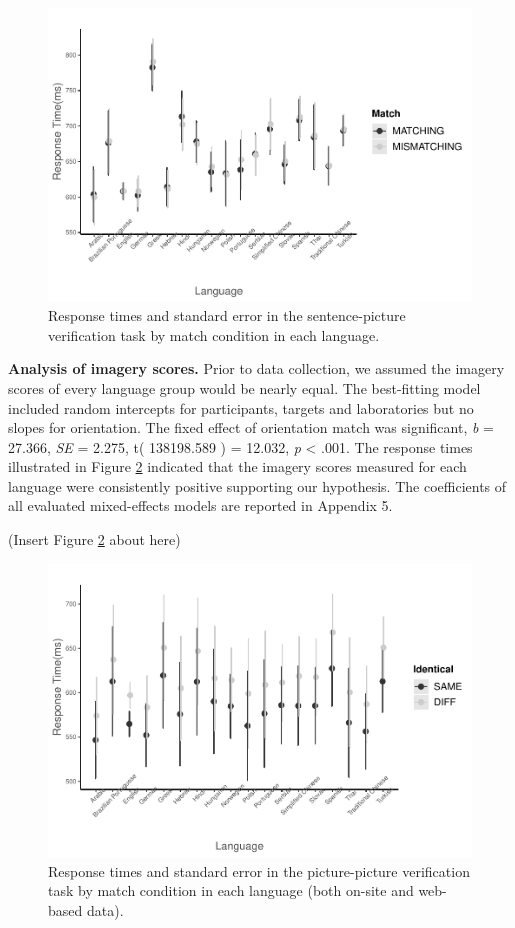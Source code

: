 \documentclass[
  man,floatsintext]{apa6}
\begin{document}
\begin{figure}
\centering
\includegraphics{Stage2_Report_0504_files/figure-latex/plot-SP-site-lme-1.pdf}
\caption{\label{fig:plot-SP-site-lme}Response times and standard error in the sentence-picture verification task by match condition in each language.}
\end{figure}

\textbf{Analysis of imagery scores.} Prior to data collection, we assumed the imagery scores of every language group would be nearly equal. The best-fitting model included random intercepts for participants, targets and laboratories but no slopes for orientation. The fixed effect of orientation match was significant, \emph{b} = 27.366, \emph{SE} = 2.275, t( 138198.589 ) = 12.032, \emph{p} \textless{} .001. The response times illustrated in Figure \ref{fig:plot-PP-lme} indicated that the imagery scores measured for each language were consistently positive supporting our hypothesis. The coefficients of all evaluated mixed-effects models are reported in Appendix 5.

(Insert Figure \ref{fig:plot-PP-lme} about here)

\begin{figure}
\centering
\includegraphics{Stage2_Report_0504_files/figure-latex/plot-PP-lme-1.pdf}
\caption{\label{fig:plot-PP-lme}Response times and standard error in the picture-picture verification task by match condition in each language (both on-site and web-based data).}
\end{figure}
\end{document}
